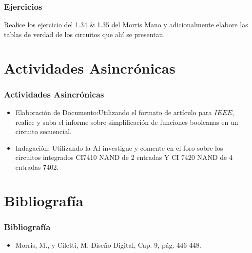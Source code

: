 \documentclass[11pt]{beamer}
\begin{document}
\begin{frame}
\frametitle{Ejercicios}
Realice los ejercicio del 1.34 \& 1.35 del Morris Mano y adicionalmente elabore las tablas de verdad de los circuitos que ah\'i se presentan.
\end{frame}

\section{Actividades Asincr\'onicas}
\begin{frame}
\frametitle{Actividades Asincr\'onicas}
	\begin{itemize}
		\item Elaboraci\'on de Documento:Utilizando el formato de art\'iculo para $IEEE$, realice y suba el informe sobre simplificación de funciones booleanas en un circuito secuencial.
		\item Indagaci\'on: Utilizando la AI investigue y comente en el foro sobre los circuitos integrados CI7410 NAND de 2 entradas Y CI 7420 NAND de 4 entradas 7402.
		\end{itemize}
\end{frame}

\section{Bibliograf\'ia}
\begin{frame}
	\frametitle{Bibliograf\'ia}
	\begin{itemize}
		\item Morris, M., y Ciletti, M. Diseño Digital, Cap. 9, pág. 446-448.
		\end{itemize}
\end{frame}
\end{document}
